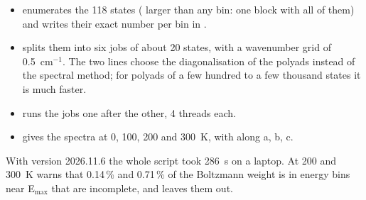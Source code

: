 \begin{itemize}
\item {} enumerates the 118 states
( larger than any bin: one block with all of them) and
writes their exact number per bin in .
\item {} splits them into six jobs of about 20
states, with a wavenumber grid of 0.5~cm$^{-1}$. The two
 lines choose the diagonalisation of the polyads
instead of the spectral method; for polyads of a few hundred to a few
thousand states it is much faster.
\item {} runs the jobs one after the other, 4
threads each.
\item {} gives the spectra at 0, 100, 200 and
300~K, with  along a, b, c.
\end{itemize}
With version 2026.11.6 the whole script took 286~s on a laptop. At 200
and 300~K  warns that 0.14\,\% and 0.71\,\% of
the Boltzmann weight is in energy bins near E$_\mathrm{max}$ that are
incomplete, and leaves them out.

